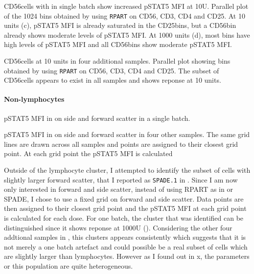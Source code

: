 
{  CD56\high cells with in single batch show increased pSTAT5 MFI at 10U. }
{
    Parallel plot of the 1024 bins obtained by using \texttt{RPART} on CD56, CD3, CD4 and CD25.
    At 10 units (c), pSTAT5 MFI is already saturated in the CD25\high bins, but a CD56\high bin already shows moderate levels of pSTAT5 MFI.
    At 1000 units (d), most bins have high levels of pSTAT5 MFI and all CD56\positive bins show moderate pSTAT5 MFI.
}

{ CD56\high cells at 10 units in four additional samples.  }
{
    Parallel plot showing bins obtained by using \texttt{RPART} on CD56, CD3, CD4 and CD25.
    The subset of CD56\high cells appears to exist in all samples and shows reponse at 10 units.
}

\paragraph{Non-lymphocytes}

{ pSTAT5 MFI in on side and forward scatter in a single batch. } 
{

}

{ pSTAT5 MFI in on side and forward scatter in four other samples. } 
{
    The same grid lines are drawn across all samples and points are assigned to their closest grid point.
    At each grid point the pSTAT5 MFI is calculated
}

Outside of the lymphocyte cluster, I attempted to identify the subset of cells with slightly larger forward scatter, that I reported as \texttt{SPADE.1} in .
Since I am now only interested in forward and side scatter, instead of using RPART as in  or SPADE, I chose to use a fixed grid on forward and side scatter.
Data points are  then assigned to their closest grid point and the pSTAT5 MFI at each grid point is calculated for each dose.
For one batch, the cluster that was identified can be distinguished since it shows reponse at 1000U ().
Considering the other four addtional samples in , this clusters appears consistently which suggests that it is not merely a one batch artefact and could possible be a real subset of cells which are slightly larger than lymphocytes.  However as I found out in x, the parameters or this population are quite heterogeneous.


